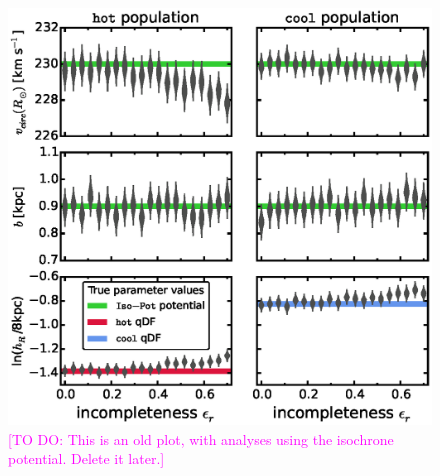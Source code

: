 \documentclass[iop,revtex4]{emulateapj}
\newcommand{\Wilma}[1]{\textcolor{Magenta}{#1}}
\begin{document}
\begin{figure}[!htbp]
\centering
\includegraphics[width=\columnwidth]{figs/isoSphFlexIncompR_violins_2.eps}
\caption{\Wilma{[TO DO: This is an old plot, with analyses using the isochrone potential. Delete it later.]}}
\end{figure}
\end{document}
